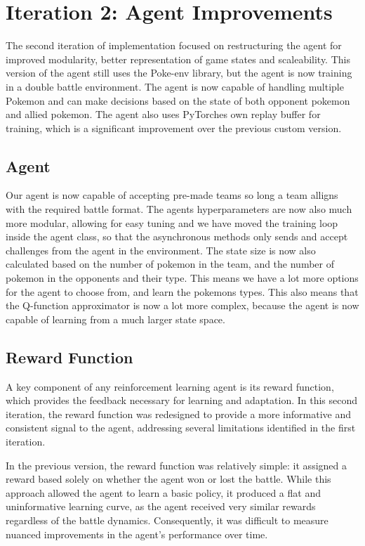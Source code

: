 \section{Iteration 2: Agent Improvements}
\label{sec:Iteration-2-Agent-Environment}
The second iteration of implementation focused on restructuring the agent for improved 
modularity, better representation of game states and scaleability. This version of the agent still
uses the Poke-env library, but the agent is now training in a double battle environment. The
agent is now capable of handling multiple Pokemon and can make decisions based on the state of 
both opponent pokemon and allied pokemon. The agent also uses PyTorches own replay buffer for
training, which is a significant improvement over the previous custom version.

\subsection{Agent}
Our agent is now capable of accepting pre-made teams so long a team alligns with the required battle
format. The agents hyperparameters are now also much more modular, allowing for easy tuning and
we have moved the training loop inside the agent class, so that the asynchronous methods only
sends and accept challenges from the agent in the environment. The state size is now also 
calculated based on the number of pokemon in the team, and the number of pokemon in the opponents 
and their type. This means we have a lot more options for the agent to choose from, and learn 
the pokemons types. This also means that the Q-function approximator is now a lot more complex,
because the agent is now capable of learning from a much larger state space. 


\subsection{Reward Function}
A key component of any reinforcement learning agent is its reward function, 
which provides the feedback necessary for learning and adaptation. 
In this second iteration, the reward function was redesigned to provide a more 
informative and consistent signal to the agent, addressing several limitations identified in the first iteration.

In the previous version, the reward function was relatively simple: it assigned a reward based solely on 
whether the agent won or lost the battle. While this approach allowed the agent to learn a basic policy, 
it produced a flat and uninformative learning curve, as the agent received very similar rewards regardless 
of the battle dynamics. Consequently, it was difficult to measure nuanced improvements in the agent's performance over time.

